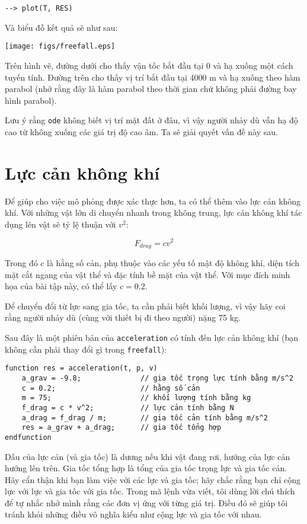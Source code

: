\documentclass[12pt]{book}
\begin{document}
\begin{verbatim}
--> plot(T, RES)
\end{verbatim}

Và biểu đồ kết quả sẽ như sau:

\centerline{\texttt{[image: figs/freefall.eps]}}

Trên hình vẽ, 
đường dưới cho thấy vận tốc bắt đầu tại 0 và hạ xuống
một cách tuyến tính. Đường trên cho thấy vị trí bắt đầu
tại 4000 m và hạ xuống theo hàm parabol (nhớ rằng đây là
hàm parabol theo thời gian chứ không phải đường bay hình
parabol).

Lưu ý rằng {\tt ode} không biết vị trí mặt đất ở đâu, vì vậy
người nhảy dù vẫn hạ độ cao từ không xuống các giá trị độ cao
âm. Ta sẽ giải quyết vấn đề này sau.


\section{Lực cản không khí}

Để giúp cho việc mô phỏng được xác thực hơn, ta có thể thêm vào
lực cản không khí. Với những vật lớn di chuyển nhanh trong không
trung, lực cản không khí tác dụng lên vật sẽ tỷ lệ thuận với $v^2$:

\[ F_{drag} = c v^2 \]

Trong đó $c$ là hằng số cản, phụ thuộc vào các yếu tố mật độ 
không khí, diện tích mặt cắt ngang của vật thể và đặc tính bề mặt
của vật thể. Với mục đích minh họa của bài tập này, có thể lấy $c = 0.2$.

Để chuyển đổi từ lực sang gia tốc, ta cần phải biết khối lượng, vì vậy
hãy coi rằng người nhảy dù (cùng với thiết bị đi theo người) nặng 75 kg.

Sau đây là một phiên bản của {\tt acceleration} có tính đến lực cản
không khí (bạn không cần phải thay đổi gì trong {\tt freefall}):

\begin{verbatim}
function res = acceleration(t, p, v)
    a_grav = -9.8;              // gia tốc trọng lực tính bằng m/s^2
    c = 0.2;                    // hằng số cản
    m = 75;                     // khối lượng tính bằng kg
    f_drag = c * v^2;           // lực cản tính bằng N
    a_drag = f_drag / m;        // gia tốc cản tính bằng m/s^2
    res = a_grav + a_drag;      // gia tốc tổng hợp
endfunction
\end{verbatim}
%
Dấu của lực cản (và gia tốc) là dương nếu khi vật đang rơi, hướng
của lực cản hướng lên trên. Gia tốc tổng hợp là tổng của gia tốc
trọng lực và gia tốc cản. Hãy cẩn thận khi bạn làm việc với các
lực và gia tốc; hãy chắc rằng bạn chỉ cộng lực với lực và gia tốc
với gia tốc. Trong mã lệnh vừa viết, tôi dùng lời chú thích để tự
nhắc nhở mình rằng các đơn vị ứng với từng giá trị. Điều đó sẽ
giúp tôi tránh khỏi những điều vô nghĩa kiểu như cộng lực và
gia tốc với nhau.
\end{document}
